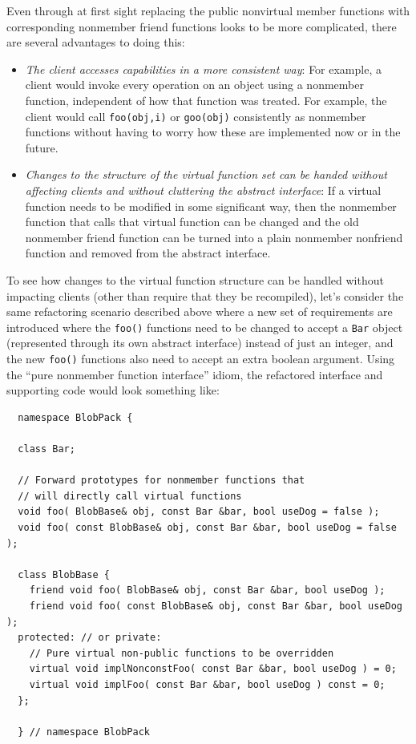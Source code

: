 \documentclass[pdf,ps2pdf,11pt]{SANDreport}
\begin{document}
Even through at first sight replacing the public nonvirtual member functions
with corresponding nonmember friend functions looks to be more complicated,
there are several advantages to doing this:

\begin{itemize}

{}\item\textit{The client accesses capabilities in a more consistent way}: For
example, a client would invoke every operation on an object using a nonmember
function, independent of how that function was treated.  For example, the
client would call {}\texttt{foo(obj,i)} or {}\texttt{goo(obj)} consistently as
nonmember functions without having to worry how these are implemented now or
in the future.

{}\item\textit{Changes to the structure of the virtual function set can be
handed without affecting clients and without cluttering the abstract
interface}: If a virtual function needs to be modified in some significant
way, then the nonmember function that calls that virtual function can be
changed and the old nonmember friend function can be turned into a plain
nonmember nonfriend function and removed from the abstract interface.

\end{itemize}

To see how changes to the virtual function structure can be handled without
impacting clients (other than require that they be recompiled), let's consider
the same refactoring scenario described above where a new set of requirements
are introduced where the {}\texttt{foo()} functions need to be changed to
accept a {}\texttt{Bar} object (represented through its own abstract
interface) instead of just an integer, and the new {}\texttt{foo()} functions
also need to accept an extra boolean argument.  Using the ``pure nonmember
function interface'' idiom, the refactored interface and supporting code would
look something like:

{\small\begin{verbatim}
  namespace BlobPack {

  class Bar;

  // Forward prototypes for nonmember functions that
  // will directly call virtual functions
  void foo( BlobBase& obj, const Bar &bar, bool useDog = false );
  void foo( const BlobBase& obj, const Bar &bar, bool useDog = false );

  class BlobBase {
    friend void foo( BlobBase& obj, const Bar &bar, bool useDog );
    friend void foo( const BlobBase& obj, const Bar &bar, bool useDog );
  protected: // or private:
    // Pure virtual non-public functions to be overridden
    virtual void implNonconstFoo( const Bar &bar, bool useDog ) = 0;
    virtual void implFoo( const Bar &bar, bool useDog ) const = 0;
  };

  } // namespace BlobPack
\end{verbatim}}
\end{document}
